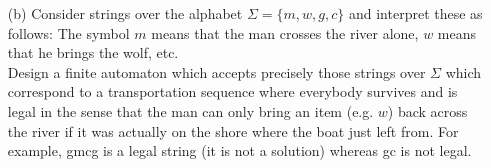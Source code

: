 \begin{enumerate}
\item [(b)] Consider strings over the alphabet $\Sigma = \{m, w, g, c\}$ and interpret these as follows: The symbol $m$ means that the man crosses the river alone, $w$ means that he brings the wolf, etc. \\ Design a finite automaton which accepts precisely those strings over $\Sigma$ which correspond to a transportation sequence where everybody survives and is legal in the sense that the man can only bring an item (e.g. $w$) back across the river if it was actually on the shore where the boat just left from. For example, gmcg is a legal string (it is not a solution) whereas gc is not legal.
\end{enumerate}



